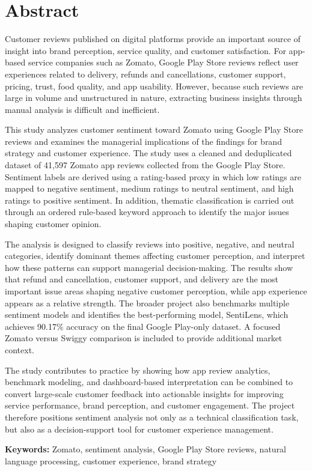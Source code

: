 \chapter*{Abstract}

Customer reviews published on digital platforms provide an important source of insight into brand perception, service quality, and customer satisfaction. For app-based service companies such as Zomato, Google Play Store reviews reflect user experiences related to delivery, refunds and cancellations, customer support, pricing, trust, food quality, and app usability. However, because such reviews are large in volume and unstructured in nature, extracting business insights through manual analysis is difficult and inefficient.

This study analyzes customer sentiment toward Zomato using Google Play Store reviews and examines the managerial implications of the findings for brand strategy and customer experience. The study uses a cleaned and deduplicated dataset of 41,597 Zomato app reviews collected from the Google Play Store. Sentiment labels are derived using a rating-based proxy in which low ratings are mapped to negative sentiment, medium ratings to neutral sentiment, and high ratings to positive sentiment. In addition, thematic classification is carried out through an ordered rule-based keyword approach to identify the major issues shaping customer opinion.

The analysis is designed to classify reviews into positive, negative, and neutral categories, identify dominant themes affecting customer perception, and interpret how these patterns can support managerial decision-making. The results show that refund and cancellation, customer support, and delivery are the most important issue areas shaping negative customer perception, while app experience appears as a relative strength. The broader project also benchmarks multiple sentiment models and identifies the best-performing model, SentiLens, which achieves 90.17\% accuracy on the final Google Play-only dataset. A focused Zomato versus Swiggy comparison is included to provide additional market context.

The study contributes to practice by showing how app review analytics, benchmark modeling, and dashboard-based interpretation can be combined to convert large-scale customer feedback into actionable insights for improving service performance, brand perception, and customer engagement. The project therefore positions sentiment analysis not only as a technical classification task, but also as a decision-support tool for customer experience management.

\textbf{Keywords:} Zomato, sentiment analysis, Google Play Store reviews, natural language processing, customer experience, brand strategy
